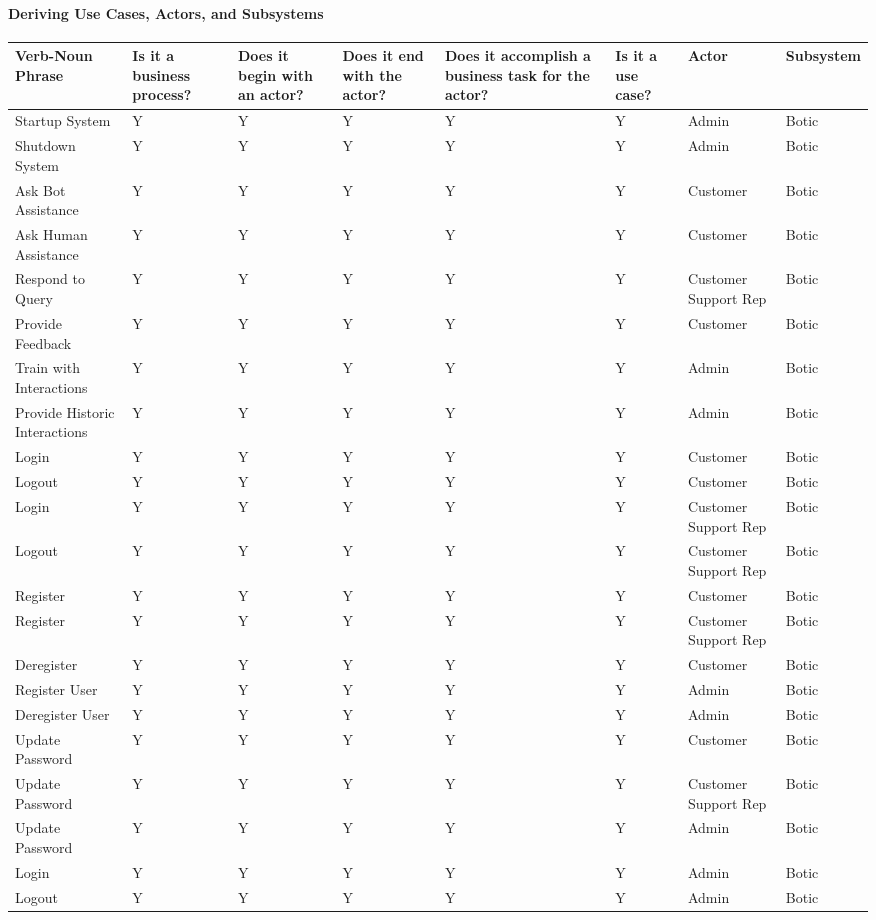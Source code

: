 \documentclass[11pt]{article}
\begin{document}
\paragraph{Deriving Use Cases, Actors, and Subsystems}
\begin{center}
	\hspace*{-0.9cm}\begin{tabular}{|p{2cm}|p{2cm}|p{2cm}|p{2cm}|p{2cm}|p{2cm}|p{2cm}|p{2cm}|}
		\hline
		Verb-Noun Phrase & Is it a business process? & Does it begin with an actor? & Does it end with the actor? & Does it accomplish a business task for the actor? & Is it a use case? & Actor & Subsystem \\
		\hline
		Startup System & Y & Y & Y & Y & Y & Admin & Botic \\
		\hline
		Shutdown System & Y & Y & Y & Y & Y & Admin & Botic \\
		\hline
		Ask Bot Assistance & Y & Y & Y & Y & Y & Customer & Botic \\ %
		\hline
		Ask Human Assistance & Y & Y & Y & Y & Y & Customer & Botic \\
		\hline
		Respond to Query & Y & Y & Y & Y & Y & Customer Support Rep & Botic \\
		\hline
		Provide Feedback & Y & Y & Y & Y & Y & Customer & Botic \\
		\hline
		Train with Interactions & Y & Y & Y & Y & Y & Admin & Botic \\ %
		\hline
		Provide Historic Interactions & Y & Y & Y & Y & Y & Admin & Botic \\
		\hline
		Login & Y & Y & Y & Y & Y & Customer & Botic \\
		\hline
		Logout & Y & Y & Y & Y & Y & Customer & Botic \\
		\hline
		Login & Y & Y & Y & Y & Y & Customer Support Rep & Botic \\
		\hline
		Logout & Y & Y & Y & Y & Y & Customer Support Rep & Botic \\
		\hline
		Register & Y & Y & Y & Y & Y & Customer & Botic \\
		\hline
		Register & Y & Y & Y & Y & Y & Customer Support Rep & Botic \\
		\hline
		Deregister & Y & Y & Y & Y & Y & Customer & Botic \\
		\hline
		Register User & Y & Y & Y & Y & Y & Admin & Botic \\
		\hline
		Deregister User & Y & Y & Y & Y & Y & Admin & Botic \\
		\hline
		Update Password & Y & Y & Y & Y & Y & Customer & Botic \\
		\hline
		Update Password & Y & Y & Y & Y & Y & Customer Support Rep & Botic \\
		\hline
		Update Password & Y & Y & Y & Y & Y & Admin & Botic \\
		\hline
		Login & Y & Y & Y & Y & Y & Admin & Botic \\
		\hline
		Logout & Y & Y & Y & Y & Y & Admin & Botic \\
		\hline		
	\end{tabular}
\end{center}
\end{document}
